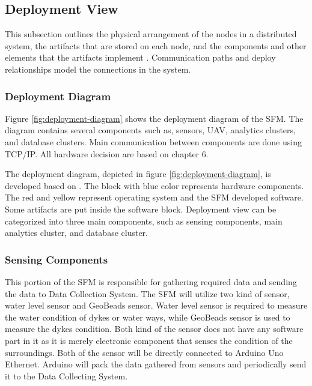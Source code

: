 \clearpage
\subsection{Deployment View}
This subsection outlines the physical arrangement of the nodes in a distributed system, the artifacts that are stored on each node, and the components and other elements that the artifacts implement \cite{ibmdeployment}. Communication paths and deploy relationships model the connections in the system.

\subsubsection{Deployment Diagram}
Figure \ref{fig:deployment-diagram} shows the deployment diagram of the \gls{SFM}. The diagram contains several components such as, sensors, \gls{UAV}, analytics clusters, and database clusters. Main communication between components are done using TCP/IP. All hardware decision are based on chapter 6.
	

\begin{landscape}
	\begin{figure}[hb!]
	\centering
	\texttt{[image: \{\\viewimages/deployment-view]}.png}
	\caption{Deployment diagram}
	\label{fig:deployment-diagram}
	\end{figure}
\end{landscape}


The deployment diagram, depicted in figure \ref{fig:deployment-diagram}, is developed based on \cite{ibmdeployment}. The block with blue color represents hardware components. The red and yellow represent operating system and the SFM developed software. Some artifacts are put inside the software block. Deployment view can be categorized into three main components, such as sensing components, main analytics cluster, and database cluster.

\subsubsection*{Sensing Components}
This portion of the \gls{SFM} is responsible for gathering required data and sending the data to Data Collection System. The \gls{SFM} will utilize two kind of sensor, water level sensor and GeoBeads sensor. Water level sensor is required to measure the water condition of dykes or water ways, while GeoBeads sensor is used to measure the dykes condition. Both kind of the sensor does not have any software part in it as it is merely electronic component that senses the condition of the surroundings. Both of the sensor will be directly connected to Arduino Uno Ethernet. Arduino will pack the data gathered from sensors and periodically send it to the Data Collecting System.

